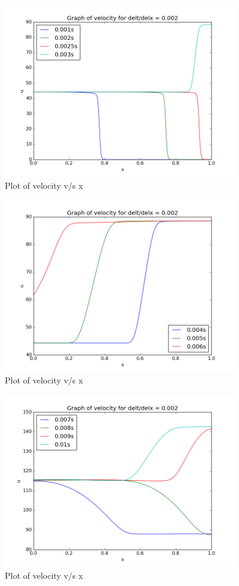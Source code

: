 \documentclass[11pt, a4paper]{article}
\begin{document}
\begin{figure}[H]
 \centering
 \includegraphics[width = 0.9\textwidth]{lax_fed_4_4.png}
 \caption{Plot of velocity v/s x}
\end{figure}
\begin{figure}[H]
 \centering
 \includegraphics[width = 0.9\textwidth]{lax_fed_4_5.png}
 \caption{Plot of velocity v/s x}
\end{figure}
\begin{figure}[H]
 \centering
 \includegraphics[width = 0.9\textwidth]{lax_fed_4_6.png}
 \caption{Plot of velocity v/s x}
\end{figure}
\end{document}
